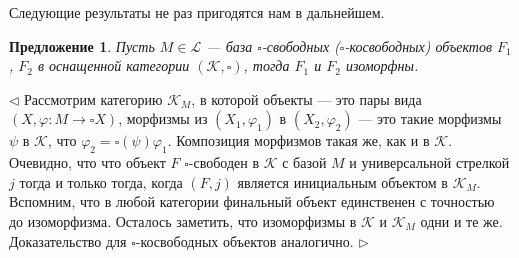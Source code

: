 \documentclass[12pt]{article}
\newtheorem{proposition}[theorem]{Предложение}
\newenvironment{proof}{\par $\triangleleft$}{$\triangleright$}
\begin{document}
Следующие результаты не раз пригодятся нам в дальнейшем.

\begin{proposition}\label{PrUniqFr}
Пусть $M\in\mathcal{L}$ --- база $\square$-свободных ($\square$-косвободных) объектов $F_1$, $F_2$ в оснащенной категории $(\mathcal{K},\square)$, тогда $F_1$ и $F_2$ изоморфны.  
\end{proposition}
\begin{proof}
Рассмотрим категорию $\mathcal{K}_M$, в которой объекты --- это пары вида $(X,\varphi:M\to\square X)$, морфизмы из $(X_1,\varphi_1)$ в $(X_2,\varphi_2)$ --- это такие морфизмы $\psi$ в 
$\mathcal{K}$, что $\varphi_2=\square(\psi)\varphi_1$. Композиция морфизмов такая же, как и в $\mathcal{K}$. Очевидно, что что объект $F$ $\square$-свободен в $\mathcal{K}$ с базой $M$ и 
универсальной стрелкой $j$ тогда и только тогда, когда $(F,j)$ является инициальным объектом в $\mathcal{K}_M$. Вспомним, что в любой категории финальный объект единственен с точностью до 
изоморфизма. Осталось заметить, что изоморфизмы в $\mathcal{K}$ и $\mathcal{K}_M$ одни и те же. Доказательство для $\square$-косвободных объектов аналогично.
\end{proof}
\end{document}
